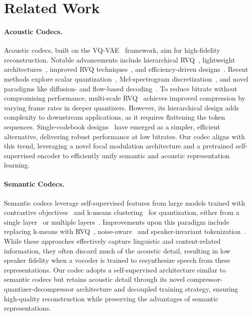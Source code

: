 \section{Related Work}
\label{sec:related_work}

\paragraph{Acoustic Codecs.} Acoustic codecs, built on the VQ-VAE~\cite{vandenord2017vqvae} framework, aim for high-fidelity reconstruction. Notable advancements include hierarchical RVQ~\cite{zeghidour2021soundstream}, lightweight architectures~\cite{defossez2023encodec}, improved RVQ techniques~\cite{kumar2023dac}, and efficiency-driven designs~\cite{yang2023hifi, yong2024ticodec, ai2024apcodec}. Recent methods explore scalar quantization~\cite{mentzer2024finite, yang2024sqcodec}, Mel-spectrogram discretization~\cite{bai2024dmel}, and novel paradigms like diffusion- and flow-based decoding~\cite{wu2024scoredec, yang2024ladiff, pia2024flowmac}.
To reduce bitrate without compromising performance, multi-scale RVQ~\cite{siuzdak2024snac, qiu2024efficient} achieves improved compression by varying frame rates in deeper quantizers. However, its hierarchical design adds complexity to downstream applications, as it requires flattening the token sequences.
Single-codebook designs~\cite{li2024singlecodec, guo2024lscodec, ji2024wavtokenizer, xin2024bigcodec, wu2024ts3codec} have emerged as a simpler, efficient alternative, delivering robust performance at low bitrates. Our codec aligns with this trend, leveraging a novel focal modulation architecture and a pretrained self-supervised encoder to efficiently unify semantic and acoustic representation learning.


\paragraph{Semantic Codecs.} Semantic codecs leverage self-supervised features from large models trained with contrastive objectives~\cite{baevski2020wav2vec2, hsu2021hubert, chen2022wavlm} and k-means clustering~\cite{lloyd1982kmeans} for quantization, either from a single layer~\cite{polyak2021discrete, wang2024selm} or multiple layers~\cite{mousavi2024how, shi2024mmm}.
Improvements upon this paradigm include replacing k-means with RVQ~\cite{huang2024repcodec}, noise-aware~\cite{messica24nast} and speaker-invariant tokenization~\cite{chang2024dcspins}. 
While these approaches effectively capture linguistic and content-related information, they often discard much of the acoustic detail, resulting in low speaker fidelity when a vocoder is trained to resynthesize speech from these representations.
Our codec adopts a self-supervised architecture similar to semantic codecs but retains acoustic detail through its novel compressor-quantizer-decompressor architecture and decoupled training strategy, ensuring high-quality reconstruction while preserving the advantages of semantic representations.



